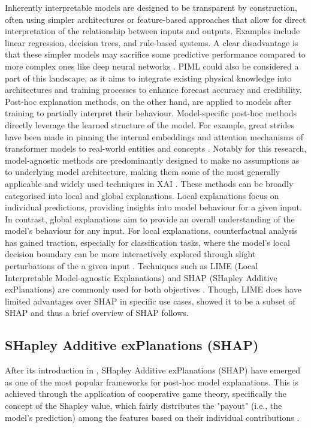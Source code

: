 Inherently interpretable models are designed to be transparent by construction, often using simpler architectures or feature-based approaches that allow for direct interpretation of the relationship between inputs and outputs. Examples include linear regression, decision trees, and rule-based systems. A clear disadvantage is that these simpler models may sacrifice some predictive performance compared to more complex ones like deep neural networks . PIML could also be considered a part of this landscape, as it aims to integrate existing physical knowledge into architectures and training processes to enhance forecast accuracy and credibility. Post-hoc explanation methods, on the other hand, are applied to models after training to partially interpret their behaviour. Model-specific post-hoc methods directly leverage the learned structure of the model. For example, great strides have been made in pinning the internal embeddings and attention mechanisms of transformer models to real-world entities and concepts . Notably for this research, model-agnostic methods are predominantly designed to make no assumptions as to underlying model architecture, making them some of the most generally applicable and widely used techniques in XAI . These methods can be broadly categorised into local and global explanations. Local explanations focus on individual predictions, providing insights into model behaviour for a given input. In contrast, global explanations aim to provide an overall understanding of the model's behaviour for any input. For local explanations, counterfactual analysis has gained traction, especially for classification tasks, where the model's local decision boundary can be more interactively explored through slight perturbations of the a given input \citep{Mothilal2019}. Techniques such as LIME (Local Interpretable Model-agnostic Explanations) and SHAP (SHapley Additive exPlanations) are commonly used for both objectives \citep{Lundberg2017}. Though, LIME does have limited advantages over SHAP in specific use cases, \cite{Lundberg2017} showed it to be a subset of SHAP and thus a brief overview of SHAP follows.

\subsection{SHapley Additive exPlanations (SHAP)}

After its introduction in \cite{Lundberg2017}, SHapley Additive exPlanations (SHAP) have emerged as one of the most popular frameworks for post-hoc model explanations. This is achieved through the application of cooperative game theory, specifically the concept of the Shapley value, which fairly distributes the "payout" (i.e., the model's prediction) among the features based on their individual contributions .

